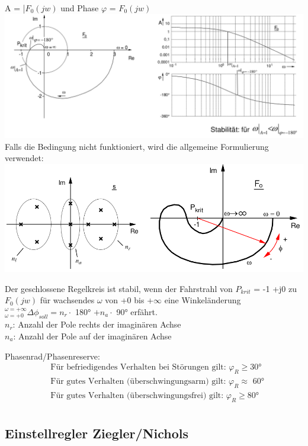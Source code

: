 \documentclass[10pt,a4paper]{article}
\begin{document}
    A = |$F_0 (jw)$ und Phase $\varphi$ = $F_0(jw)$\\
    \includegraphics[width=.5\textwidth]{Figures/Nyquist_Bode.png}
    Falls die Bedingung nicht funktioniert, wird die allgemeine Formulierung verwendet:\\
    \includegraphics[width=.5\textwidth]{Figures/Allgemein_Nyquist.png}
    \begin{mdframed}[style=exercise]
        Der geschlossene Regelkreis ist stabil, wenn der Fahrstrahl von $P_{krit}$ = -1 +j0
        zu $F_0 (jw)$ für wachsendes $\omega$ von +0 bis +$\infty$ eine Winkeländerung
        $^{\omega=+\infty}_{\omega=+0} \Delta \phi _{soll} = n_r \cdot$ 180° $+n_a \cdot$ 90°
        erfährt.\\
        $n_r$: Anzahl der Pole rechts der imaginären Achse\\
        $n_a$: Anzahl der Pole auf der imaginären Achse\\
    \end{mdframed}
    Phasenrad/Phasenreserve:
    \begin{align*}
        &\text{Für befriedigendes Verhalten bei Störungen gilt: }\varphi _R \geq \text{30°}\\
        &\text{Für gutes Verhalten (überschwingungsarm) gilt: }\varphi _R \approx \text{ 60°}\\
        &\text{Für gutes Verhalten (überschwingungsfrei) gilt: }\varphi _R \geq \text{80°}\\
    \end{align*}

    \subsection{Einstellregler Ziegler/Nichols}
\end{document}
